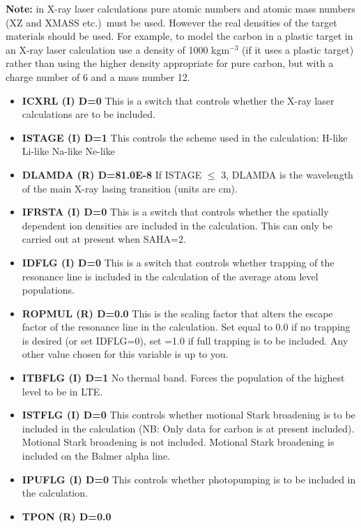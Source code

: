 {\bf Note:} in X-ray laser calculations pure
atomic numbers and atomic mass numbers (XZ and XMASS  etc.)\
must be used. However the real densities of the target materials
should be used. For example, to model the carbon in a plastic target
in an X-ray laser calculation use
a density of 1000 kgm$^{-3}$ (if it uses a plastic target) rather than
using the higher density appropriate for pure carbon, but
with a charge number of 6 and a mass number 12.
\begin{itemize}
\item {\bf ICXRL (I) D=0}
This is a switch that controls whether the
X-ray laser calculations are to be included.
\item {\bf ISTAGE (I) D=1}
This controls the scheme used in the calculation:
 H-like
 Li-like
 Na-like
 Ne-like
\item {\bf DLAMDA (R) D=81.0E-8}
If ISTAGE $\le$ 3, DLAMDA is the wavelength of the main X-ray lasing transition (units are cm).
\item {\bf IFRSTA (I) D=0}
This is a switch that controls whether the
spatially dependent ion densities
are included in the calculation. 
This can only  be carried out at present
when SAHA=2.
\item {\bf IDFLG (I) D=0}
This is a switch that controls whether trapping of the resonance line
is included in the calculation of the average atom level populations.
\item {\bf ROPMUL (R) D=0.0}
This is the scaling factor that alters the escape
factor of the resonance line
in the calculation. Set equal to 0.0 if no trapping is desired (or
set IDFLG=0), set =1.0 if full trapping is to be included. Any other
value chosen for this variable is up to you.
\item {\bf ITBFLG (I) D=1}
 No thermal band.
 Forces the population of the highest level to be in LTE.
\item {\bf ISTFLG (I) D=0}
This controls whether motional Stark broadening is to be included in
the calculation (NB: Only data for carbon is at present included).
\itemitem{0} Motional Stark broadening is not included.
 Motional Stark broadening is included on the Balmer alpha
line.
\item {\bf IPUFLG (I) D=0}
This controls whether photopumping is to be included in the calculation.
\item {\bf TPON (R) D=0.0}

\end{itemize}
